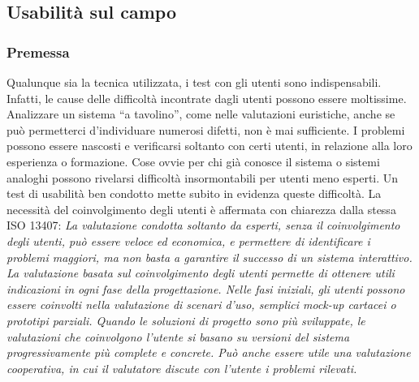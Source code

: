 \subsection{Usabilità sul campo}
    \subsubsection{Premessa}
        \begin{flushleft}
        Qualunque sia la tecnica utilizzata, i test con gli utenti sono indispensabili. Infatti, le cause delle difficoltà incontrate
        dagli utenti possono essere moltissime. Analizzare un sistema “a tavolino”, come nelle valutazioni euristiche, anche se
        può permetterci d’individuare numerosi difetti, non è mai sufficiente. I problemi possono essere nascosti e verificarsi
        soltanto con certi utenti, in relazione alla loro esperienza o formazione. Cose ovvie per chi già conosce il sistema o
        sistemi analoghi possono rivelarsi difficoltà insormontabili per utenti meno esperti. Un test di usabilità ben condotto
        mette subito in evidenza queste difficoltà. La necessità del coinvolgimento degli utenti è affermata con chiarezza dalla
        stessa ISO 13407: 
            \emph{La valutazione condotta soltanto da esperti, senza il coinvolgimento degli utenti, può essere veloce ed
            economica, e permettere di identificare i problemi maggiori, ma non basta a garantire il successo di un
            sistema interattivo. La valutazione basata sul coinvolgimento degli utenti permette di ottenere utili indicazioni
            in ogni fase della progettazione. Nelle fasi iniziali, gli utenti possono essere coinvolti nella valutazione di
            scenari d’uso, semplici mock-up cartacei o prototipi parziali. Quando le soluzioni di progetto sono più
            sviluppate, le valutazioni che coinvolgono l’utente si basano su versioni del sistema progressivamente più
            complete e concrete. Può anche essere utile una valutazione cooperativa, in cui il valutatore discute con
            l’utente i problemi rilevati.}
        \end{flushleft}
    

